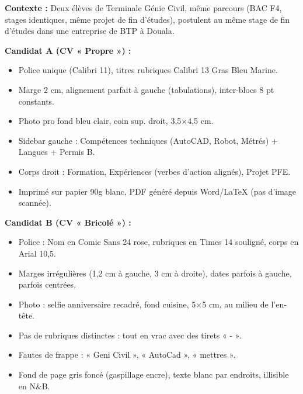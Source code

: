 \documentclass[11pt]{article}
\begin{document}
\begin{exoresolu}
\textbf{Contexte :} Deux élèves de Terminale Génie Civil, même parcours (BAC F4, stages identiques, même projet de fin d'études), postulent au même stage de fin d'études dans une entreprise de BTP à Douala.

\textbf{Candidat A (CV « Propre ») :}
\begin{itemize}
    \item Police unique (Calibri 11), titres rubriques Calibri 13 Gras Bleu Marine.
    \item Marge 2 cm, alignement parfait à gauche (tabulations), inter-blocs 8 pt constants.
    \item Photo pro fond bleu clair, coin sup. droit, 3,5×4,5 cm.
    \item Sidebar gauche : Compétences techniques (AutoCAD, Robot, Métrés) + Langues + Permis B.
    \item Corps droit : Formation, Expériences (verbes d'action alignés), Projet PFE.
    \item Imprimé sur papier 90g blanc, PDF généré depuis Word/LaTeX (pas d'image scannée).
\end{itemize}

\textbf{Candidat B (CV « Bricolé ») :}
\begin{itemize}
    \item Police : Nom en Comic Sans 24 rose, rubriques en Times 14 souligné, corps en Arial 10,5.
    \item Marges irrégulières (1,2 cm à gauche, 3 cm à droite), dates parfois à gauche, parfois centrées.
    \item Photo : selfie anniversaire recadré, fond cuisine, 5×5 cm, au milieu de l'en-tête.
    \item Pas de rubriques distinctes : tout en vrac avec des tirets « - ».
    \item Fautes de frappe : « Geni Civil », « AutoCad », « mettres ».
    \item Fond de page gris foncé (gaspillage encre), texte blanc par endroits, illisible en N\&B.
\end{itemize}


\end{exoresolu}
\end{document}
